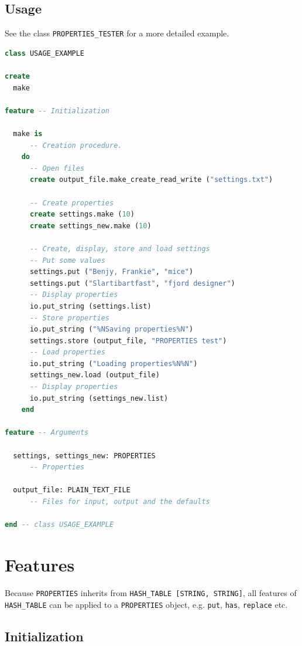 \documentclass[a4paper,fleqn]{report}
\begin{document}
\section{Usage}
\label{sec:usage}

See the class \texttt{PROPERTIES\_TESTER} for a more detailed example.

\begin{lstlisting}[language=Eiffel]
class USAGE_EXAMPLE

create 
  make

feature -- Initialization

  make is
      -- Creation procedure.
    do                  
      -- Open files
      create output_file.make_create_read_write ("settings.txt")
                        
      -- Create properties
      create settings.make (10)
      create settings_new.make (10)
                        
      -- Create, display, store and load settings
      -- Put some values
      settings.put ("Benjy, Frankie", "mice")
      settings.put ("Slartibartfast", "fjord designer")
      -- Display properties
      io.put_string (settings.list)
      -- Store properties
      io.put_string ("%NSaving properties%N")
      settings.store (output_file, "PROPERTIES test")
      -- Load properties
      io.put_string ("Loading properties%N%N")
      settings_new.load (output_file)
      -- Display properties
      io.put_string (settings_new.list)
    end
                
feature -- Arguments

  settings, settings_new: PROPERTIES
      -- Properties
                        
  output_file: PLAIN_TEXT_FILE
      -- Files for input, output and the defaults
        
end -- class USAGE_EXAMPLE
\end{lstlisting}


\chapter{Features}
\label{cha:features}

Because \texttt{PROPERTIES} inherits from \texttt{HASH\_TABLE [STRING,
  STRING]}, all features of \texttt{HASH\_TABLE} can be applied to a
\texttt{PROPERTIES} object, e.g. \texttt{put}, \texttt{has},
\texttt{replace} etc.

\section{Initialization}
\label{sec:initialization}
\end{document}
